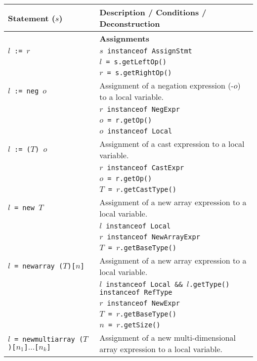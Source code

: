 \documentclass{article}
\begin{document}
\begin{scriptsize}
\begin{tabular}{ll}
\hline
\textbf{Statement} ($s$)      & \textbf{Description / Conditions / Deconstruction}\\
\hline
\hline
                & \textbf{Assignments}\\
\texttt{$l$ := $r$}           & \texttt{$s$ instanceof AssignStmt}\\
                & \texttt{$l$ = s.getLeftOp()}\\
                & \texttt{$r$ = s.getRightOp()}\\
\hline
\texttt{$l$ := neg $o$}           & Assignment of a negation expression (-$o$) to a local variable.\\
                & \texttt{$r$ instanceof NegExpr}\\
                & \texttt{$o$ = r.getOp()}\\
                & \texttt{$o$ instanceof Local}\\
\hline
\texttt{$l$ := ($T$) $o$}           & Assignment of a cast expression to a local variable.\\
                & \texttt{$r$ instanceof CastExpr}\\
                & \texttt{$o$ = r.getOp()}\\
                & \texttt{$T$ = $r$.getCastType()}\\
\hline
\texttt{$l$ = new $T$}           & Assignment of a new array expression to a local variable.\\
                & \texttt{$l$ instanceof Local}\\
                & \texttt{$r$ instanceof NewArrayExpr}\\
                & \texttt{$T$ = $r$.getBaseType()}\\
\hline
\texttt{$l$ = newarray ($T$)[$n$]}           & Assignment of a new array expression to a local variable.\\
                & \texttt{$l$ instanceof Local \&\& $l$.getType() instanceof RefType}\\
                & \texttt{$r$ instanceof NewExpr}\\
                & \texttt{$T$ = $r$.getBaseType()}\\
                & \texttt{$n$ = $r$.getSize()}\\
\hline
\texttt{$l$ = newmultiarray ($T$)[$n_1$]$\ldots$[$n_k$]}           & Assignment of a new multi-dimensional array expression to a local variable.\\

\end{tabular}
\end{scriptsize}
\end{document}
